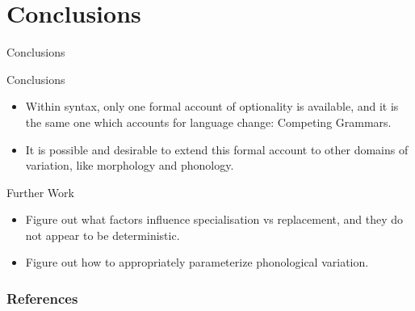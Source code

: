 \documentclass[hyperref={pdfpagelabels=false}]{beamer}
\begin{document}
\section{Conclusions}
\begin{frame}{Conclusions}
	\begin{block}{Conclusions}
		\begin{itemize}
			\item Within syntax, only one formal account of optionality is available, and it is the same one which accounts for language change: Competing Grammars.
			\item It is possible and desirable to extend this formal account to other domains of variation, like morphology and phonology.
		\end{itemize}
	\end{block}
	\begin{block}{Further Work}
		\begin{itemize}
			\item Figure out what factors influence specialisation vs replacement, and they do not appear to be deterministic.
			\item Figure out how to appropriately parameterize phonological variation.
		\end{itemize}
	\end{block}

\end{frame}


\begin{frame}[allowframebreaks]
\frametitle{References}
\renewcommand*{\newblock}{natbib}


\end{frame}
\end{document}

